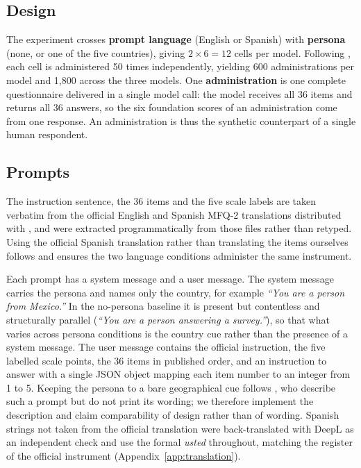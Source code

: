 \subsection{Design}
\label{subsec:design}

The experiment crosses \textbf{prompt language} (English or Spanish) with
\textbf{persona} (none, or one of the five countries), giving $2 \times 6 = 12$
cells per model. Following \textcite{munker2025cultural}, each cell is
administered 50 times independently, yielding 600 administrations per model and
1{,}800 across the three models. One \textbf{administration} is one complete
questionnaire delivered in a single model call: the model receives all 36 items
and returns all 36 answers, so the six foundation scores of an administration
come from one response. An administration is thus the synthetic counterpart of a
single human respondent.

\subsection{Prompts}
\label{subsec:prompts}

The instruction sentence, the 36 items and the five scale labels are taken
verbatim from the official English and Spanish MFQ-2 translations distributed
with \textcite{atari2023weird}, and were extracted programmatically from those
files rather than retyped. Using the official Spanish translation rather than
translating the items ourselves follows \textcite{aksoy2024whose} and ensures the
two language conditions administer the same instrument.

Each prompt has a system message and a user message. The system message carries
the persona and names only the country, for example \emph{``You are a person from
Mexico.''} In the no-persona baseline it is present but contentless and
structurally parallel (\emph{``You are a person answering a survey.''}), so that
what varies across persona conditions is the country cue rather than the presence
of a system message. The user message contains the official instruction, the five
labelled scale points, the 36 items in published order, and an instruction to
answer with a single JSON object mapping each item number to an integer from 1 to
5. Keeping the persona to a bare geographical cue follows
\textcite{munker2025cultural}, who describe such a prompt but do not print its
wording; we therefore implement the description and claim comparability of design
rather than of wording. Spanish strings not taken from the official translation
were back-translated with DeepL as an independent check and use the formal
\emph{usted} throughout, matching the register of the official instrument
(Appendix~\ref{app:translation}).

